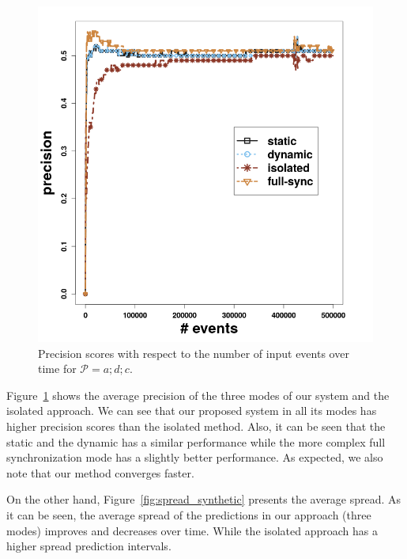 \begin{figure}[H]
	\centering
	\includegraphics[width=\textwidth]{chapters/figures/synthetic/precision_synthetic_15_0001.png}
	
	\caption{Precision scores with respect to the number of input events over time for $\mathcal{P}=a;d;c$.}
	\label{fig:precsion_synthetic}
\end{figure}

\par Figure~\ref{fig:precsion_synthetic} shows the average precision of the three modes of our system and the isolated approach. We can see that our proposed system in all its modes has higher precision scores than the isolated method. Also, it can be seen that the static and the dynamic has a similar performance while the more complex full synchronization mode has a slightly better performance. As expected, we also note that our method converges faster.
\par On the other hand, Figure~\ref{fig:spread_synthetic} presents the average spread. As it can be seen, the average spread of the predictions in our approach (three modes) improves and decreases over time. While the isolated approach has a higher spread prediction intervals. 

